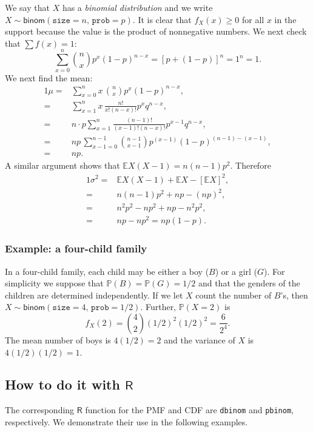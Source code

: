 We say that \(X\) has a \emph{binomial distribution} and we write
\(X\sim\mathsf{binom}(\mathtt{size}=n,\,\mathtt{prob}=p)\). It is
clear that \(f_{X}(x)\geq0\) for all \(x\) in the support because the
value is the product of nonnegative numbers. We next check that \(\sum
f(x)=1\): \[ \sum_{x = 0}^{n}{n \choose x} p^{x} (1 - p)^{n - x} =
[p + (1 - p)]^{n} = 1^{n} = 1.  \] We next find the mean:
\begin{alignat*}{1}
\mu= & \sum_{x=0}^{n}x\,{n \choose x}p^{x}(1-p)^{n-x},\\
= & \sum_{x=1}^{n}x\,\frac{n!}{x!(n-x)!}p^{x}q^{n-x},\\
= & n\cdot p\sum_{x=1}^{n}\frac{(n-1)!}{(x-1)!(n-x)!}p^{x-1}q^{n-x},\\
= & np\,\sum_{x-1=0}^{n-1}{n-1 \choose x-1}p^{(x-1)}(1-p)^{(n-1)-(x-1)},\\
= & np.
\end{alignat*}
A similar argument shows that \(\mathbb{E} X(X - 1) = n(n - 1)p^{2}\).
Therefore
\begin{alignat*}{1}
\sigma^{2}= & \mathbb{E} X(X-1)+\mathbb{E} X-[\mathbb{E} X]^{2},\\
= & n(n-1)p^{2}+np-(np)^{2},\\
= & n^{2}p^{2}-np^{2}+np-n^{2}p^{2},\\
= & np-np^{2}=np(1-p).
\end{alignat*}


\subsubsection{Example: a four-child family}
In a four-child family, each child may be either a boy (\(B\)) or a girl
(\(G\)). For simplicity we suppose that
\(\mathbb{P}(B)=\mathbb{P}(G)=1/2\) and that the genders of the
children are determined independently. If we let \(X\) count the
number of \(B\)'s, then
\(X\sim\mathsf{binom}(\mathtt{size}=4,\,\mathtt{prob}=1/2)\). Further,
\(\mathbb{P}(X=2)\) is
\[
f_{X}(2)={4 \choose 2}(1/2)^{2}(1/2)^{2}=\frac{6}{2^{4}}.
\]
The mean number of boys is \(4(1/2)=2\) and the variance of \(X\) is
\(4(1/2)(1/2)=1\).

\subsection{How to do it with \(\mathsf{R}\)}
\label{sec-5-3-1-1}

The corresponding \(\mathsf{R}\) function for the PMF and CDF are
\texttt{dbinom} and \texttt{pbinom}, respectively. We demonstrate their use in the
following examples.

